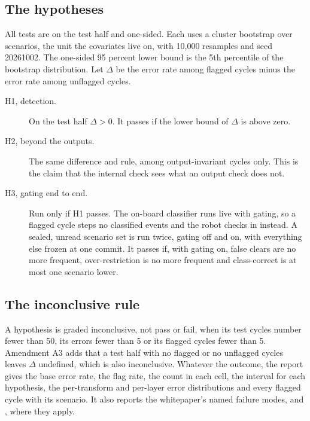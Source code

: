 \subsection{The hypotheses}

All tests are on the test half and one-sided.
Each uses a cluster bootstrap over scenarios, the unit the covariates live on, with 10{,}000
resamples and seed 20261002.
The one-sided 95 percent lower bound is the 5th percentile of the bootstrap distribution.
Let $\Delta$ be the error rate among flagged cycles minus the error rate among unflagged cycles.
\begin{description}
  \item[H1, detection.] On the test half $\Delta > 0$.
  It passes if the lower bound of $\Delta$ is above zero.
  \item[H2, beyond the outputs.] The same difference and rule, among output-invariant cycles
  only.
  This is the claim that the internal check sees what an output check does not.
  \item[H3, gating end to end.] Run only if H1 passes.
  The on-board classifier runs live with gating, so a flagged cycle steps no classified events
  and the robot checks in instead.
  A sealed, unread scenario set is run twice, gating off and on, with everything else frozen at
  one commit.
  It passes if, with gating on, false clears are no more frequent, over-restriction is no more
  frequent and class-correct is at most one scenario lower.
\end{description}

\subsection{The inconclusive rule}

A hypothesis is graded inconclusive, not pass or fail, when its test cycles number fewer than
50, its errors fewer than 5 or its flagged cycles fewer than 5.
Amendment A3 adds that a test half with no flagged or no unflagged cycles leaves $\Delta$
undefined, which is also inconclusive.
Whatever the outcome, the report gives the base error rate, the flag rate, the count in each
cell, the interval for each hypothesis, the per-transform and per-layer error distributions and
every flagged cycle with its scenario.
It also reports the whitepaper's named failure modes,  and
, where they apply.

